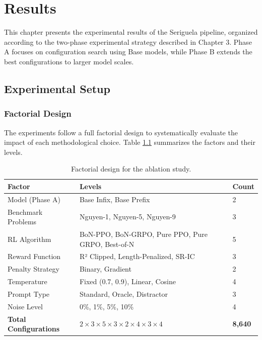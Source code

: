 \chapter{Results}

This chapter presents the experimental results of the Seriguela pipeline, organized according to the two-phase experimental strategy described in Chapter 3. Phase A focuses on configuration search using Base models, while Phase B extends the best configurations to larger model scales.

\section{Experimental Setup}

\subsection{Factorial Design}

The experiments follow a full factorial design to systematically evaluate the impact of each methodological choice. Table \ref{tab:factorial_design} summarizes the factors and their levels.

\begin{table}[h!]
    \centering
    \caption{Factorial design for the ablation study.}
    \label{tab:factorial_design}
    \begin{tabular}{lll}
    \toprule
    \textbf{Factor} & \textbf{Levels} & \textbf{Count} \\
    \midrule
    Model (Phase A) & Base Infix, Base Prefix & 2 \\
    Benchmark Problems & Nguyen-1, Nguyen-5, Nguyen-9 & 3 \\
    RL Algorithm & BoN-PPO, BoN-GRPO, Pure PPO, Pure GRPO, Best-of-N & 5 \\
    Reward Function & R² Clipped, Length-Penalized, SR-IC & 3 \\
    Penalty Strategy & Binary, Gradient & 2 \\
    Temperature & Fixed (0.7, 0.9), Linear, Cosine & 4 \\
    Prompt Type & Standard, Oracle, Distractor & 3 \\
    Noise Level & 0\%, 1\%, 5\%, 10\% & 4 \\
    \midrule
    \textbf{Total Configurations} & $2 \times 3 \times 5 \times 3 \times 2 \times 4 \times 3 \times 4$ & \textbf{8,640} \\
    \bottomrule
    \end{tabular}
\end{table}

